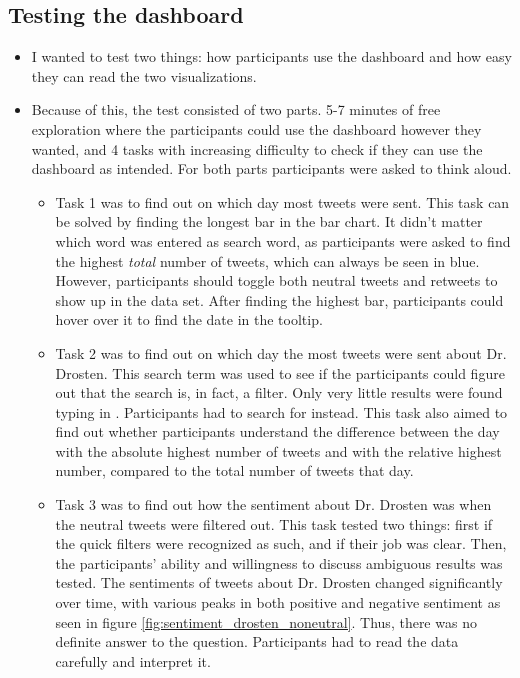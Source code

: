 \subsection{Testing the dashboard}
\begin{itemize}
    \item I wanted to test two things: how participants use the dashboard and how easy they can read the two visualizations.
    \item Because of this, the test consisted of two parts. 5-7 minutes of free exploration where the participants could use the dashboard however they wanted, and 4 tasks with increasing difficulty to check if they can use the dashboard as intended. For both parts participants were asked to think aloud.
    \begin{itemize}
        \item Task 1 was to find out on which day most tweets were sent. This task can be solved by finding the longest bar in the bar chart. It didn't matter which word was entered as search word, as participants were asked to find the highest \emph{total} number of tweets, which can always be seen in blue. However, participants should toggle both neutral tweets and retweets to show up in the data set. After finding the highest bar, participants could hover over it to find the date in the tooltip.
        \item Task 2 was to find out on which day the most tweets were sent about Dr. Drosten. This search term was used to see if the participants could figure out that the search is, in fact, a filter. Only very little results were found typing in . Participants had to search for  instead. This task also aimed to find out whether participants understand the difference between the day with the absolute highest number of tweets and with the relative highest number, compared to the total number of tweets that day.
        \item Task 3 was to find out how the sentiment about Dr. Drosten was when the neutral tweets were filtered out. This task tested two things: first if the quick filters were recognized as such, and if their job was clear. Then, the participants' ability and willingness to discuss ambiguous results was tested. The sentiments of tweets about Dr. Drosten changed significantly over time, with various peaks in both positive and negative sentiment as seen in figure \ref{fig:sentiment_drosten_noneutral}. Thus, there was no definite answer to the question. Participants had to read the data carefully and interpret it.

\end{itemize}
\end{itemize}
